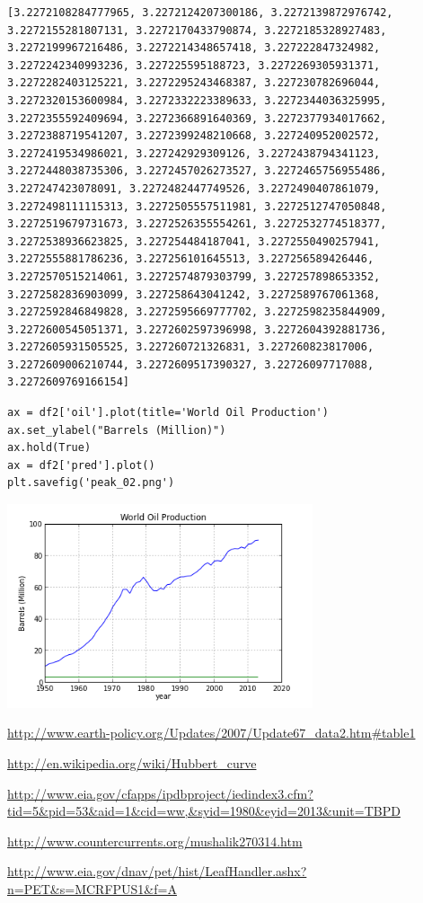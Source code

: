 \documentclass[12pt,fleqn]{article}\usepackage{../common}
\begin{document}
\begin{verbatim}
[3.2272108284777965, 3.2272124207300186, 3.2272139872976742, 3.2272155281807131, 3.2272170433790874, 3.2272185328927483, 3.2272199967216486, 3.2272214348657418, 3.227222847324982, 3.2272242340993236, 3.227225595188723, 3.2272269305931371, 3.2272282403125221, 3.2272295243468387, 3.227230782696044, 3.2272320153600984, 3.2272332223389633, 3.2272344036325995, 3.2272355592409694, 3.2272366891640369, 3.2272377934017662, 3.2272388719541207, 3.2272399248210668, 3.227240952002572, 3.2272419534986021, 3.227242929309126, 3.2272438794341123, 3.2272448038735306, 3.2272457026273527, 3.2272465756955486, 3.227247423078091, 3.2272482447749526, 3.2272490407861079, 3.2272498111115313, 3.2272505557511981, 3.2272512747050848, 3.2272519679731673, 3.2272526355554261, 3.2272532774518377, 3.2272538936623825, 3.227254484187041, 3.2272550490257941, 3.2272555881786236, 3.227256101645513, 3.227256589426446, 3.2272570515214061, 3.2272574879303799, 3.227257898653352, 3.2272582836903099, 3.227258643041242, 3.2272589767061368, 3.2272592846849828, 3.2272595669777702, 3.2272598235844909, 3.2272600545051371, 3.2272602597396998, 3.2272604392881736, 3.2272605931505525, 3.227260721326831, 3.227260823817006, 3.2272609006210744, 3.2272609517390327, 3.22726097717088, 3.2272609769166154]
\end{verbatim}

\begin{verbatim}
ax = df2['oil'].plot(title='World Oil Production')
ax.set_ylabel("Barrels (Million)")
ax.hold(True)
ax = df2['pred'].plot()
plt.savefig('peak_02.png')
\end{verbatim}

\includegraphics[height=6cm]{peak_02.png}

\url{http://www.earth-policy.org/Updates/2007/Update67_data2.htm#table1}

\url{http://en.wikipedia.org/wiki/Hubbert_curve}

\url{http://www.eia.gov/cfapps/ipdbproject/iedindex3.cfm?tid=5&pid=53&aid=1&cid=ww,&syid=1980&eyid=2013&unit=TBPD}

\url{http://www.countercurrents.org/mushalik270314.htm}

\url{http://www.eia.gov/dnav/pet/hist/LeafHandler.ashx?n=PET&s=MCRFPUS1&f=A}
\end{document}
